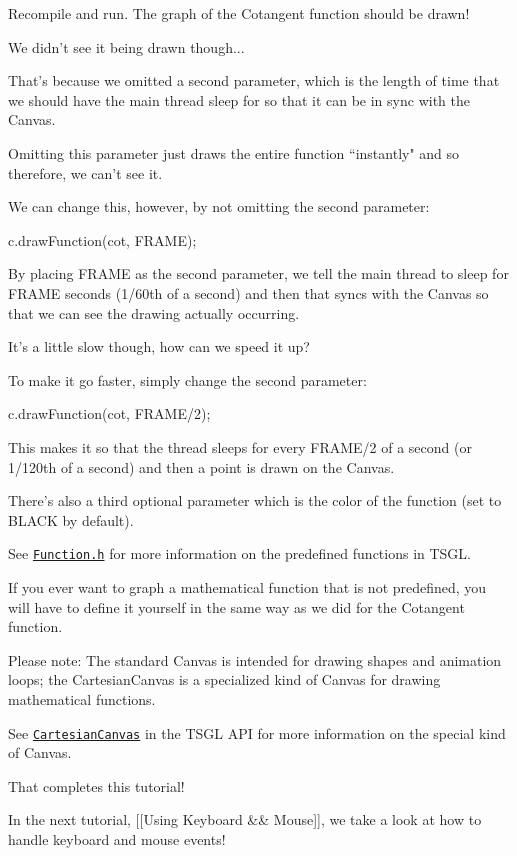 Recompile and run. The graph of the {\ttfamily Cotangent} function should be drawn!

We didn't see it being drawn though...

That's because we omitted a second parameter, which is the length of time that we should have the main thread sleep for so that it can be in sync with the Canvas.

Omitting this parameter just draws the entire function “instantly" and so therefore, we can't see it.

We can change this, however, by not omitting the second parameter\-:


\begin{DoxyCode}
c.drawFunction(cot, FRAME);
\end{DoxyCode}


By placing {\ttfamily F\-R\-A\-M\-E} as the second parameter, we tell the main thread to sleep for {\ttfamily F\-R\-A\-M\-E} seconds (1/60th of a second) and then that syncs with the Canvas so that we can see the drawing actually occurring.

It's a little slow though, how can we speed it up?

To make it go faster, simply change the second parameter\-:


\begin{DoxyCode}
c.drawFunction(cot, FRAME/2);
\end{DoxyCode}


This makes it so that the thread sleeps for every {\ttfamily F\-R\-A\-M\-E/2} of a second (or 1/120th of a second) and then a point is drawn on the Canvas.

There's also a third optional parameter which is the color of the function (set to {\ttfamily B\-L\-A\-C\-K} by default).

See \href{http://calvin-cs.github.io/TSGL/html/classtsgl_1_1_function.html}{\tt Function.\-h} for more information on the predefined functions in T\-S\-G\-L.

If you ever want to graph a mathematical function that is not predefined, you will have to define it yourself in the same way as we did for the {\ttfamily Cotangent} function.

Please note\-: The standard Canvas is intended for drawing shapes and animation loops; the Cartesian\-Canvas is a specialized kind of Canvas for drawing mathematical functions.

See \href{http://calvin-cs.github.io/TSGL/html/classtsgl_1_1_cartesian_canvas.html}{\tt Cartesian\-Canvas} in the T\-S\-G\-L A\-P\-I for more information on the special kind of Canvas.

That completes this tutorial!

In the next tutorial, \mbox{[}\mbox{[}Using Keyboard \&\& Mouse\mbox{]}\mbox{]}, we take a look at how to handle keyboard and mouse events! 